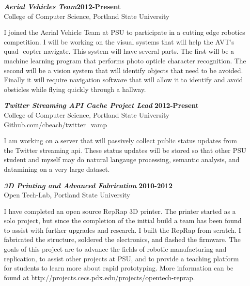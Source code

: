 \documentclass[margin]{res}
\begin{document}
\begin{resume}
				{\sl \textbf{Aerial Vehicles Team}}\hfill \textbf{2012-Present} \\
				College of Computer Science, Portland State University

				I joined the Aerial Vehicle Team at PSU to participate in a cutting edge robotics
				competition.  I will be working on the visual systems that will help the AVT's quad-
				copter navigate.  This system will have several parts.  The first will be a machine
				learning program that performs photo opticle character recognition.  The second will
				be a vision system that will identify objects that need to be avoided.  Finally it 
				will require navigation software that will allow it to identify and avoid obsticles
				while flying quickly through a hallway.

				{\sl \textbf{Twitter Streaming API Cache Project Lead}} \hfill \textbf{2012-Present} \\
				College of Computer Science, Portland State University \\
				Github.com/cbeach/twitter\_vamp 

				I am working on a server that will passively collect public status updates from the
				Twitter streaming api.  These status updates will be stored so that other PSU student
				and myself may do natural langauge processing, semantic analysis, and datamining on
				a very large dataset.				

				{\sl \textbf{3D Printing and Advanced Fabrication}} \hfill \textbf{2010-2012} \\
                Open Tech-Lab, Portland State University
				
				I have completed an open source RepRap 3D printer. The printer started as a solo project, 
				but since the completion of the initial build a team has been found to assist with further 
				upgrades and research.  I built the RepRap from scratch.  I fabricated the structure, soldered  
				the electronics, and flashed the firmware. 	The goals of this project are to advance the 
				fields of robotic manufacturing and replication, to assist other projects at PSU, and to 
				provide a teaching platform for students to learn more about rapid prototyping. 
				More information can be found at http://projects.cecs.pdx.edu/projects/opentech-reprap. 
	

\end{resume}
\end{document}
